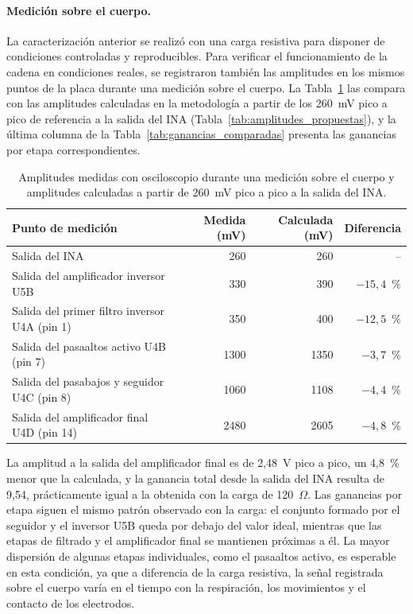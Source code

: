 \documentclass[12pt,a4paper]{article}
\begin{document}
\paragraph{Medición sobre el cuerpo.}
La caracterización anterior se realizó con una carga resistiva para disponer de condiciones
controladas y reproducibles. Para verificar el funcionamiento de la cadena en condiciones reales,
se registraron también las amplitudes en los mismos puntos de la placa durante una medición sobre
el cuerpo. La Tabla~\ref{tab:amplitudes_cuerpo} las compara con las amplitudes calculadas en la
metodología a partir de los 260~mV pico a pico de referencia a la salida del INA
(Tabla~\ref{tab:amplitudes_propuestas}), y la última columna de la
Tabla~\ref{tab:ganancias_comparadas} presenta las ganancias por etapa correspondientes.

\begin{table}[htbp]
    \centering
    \caption{Amplitudes medidas con osciloscopio durante una medición sobre el cuerpo y amplitudes
    calculadas a partir de 260~mV pico a pico a la salida del INA.}
    \label{tab:amplitudes_cuerpo}
    \begin{tabular}{lrrr}
        \hline
        Punto de medición & Medida (mV) & Calculada (mV) & Diferencia \\
        \hline
        Salida del INA & 260 & 260 & -- \\
        Salida del amplificador inversor U5B & 330 & 390 & $-15{,}4$~\% \\
        Salida del primer filtro inversor U4A (pin 1) & 350 & 400 & $-12{,}5$~\% \\
        Salida del pasaaltos activo U4B (pin 7) & 1300 & 1350 & $-3{,}7$~\% \\
        Salida del pasabajos y seguidor U4C (pin 8) & 1060 & 1108 & $-4{,}4$~\% \\
        Salida del amplificador final U4D (pin 14) & 2480 & 2605 & $-4{,}8$~\% \\
        \hline
    \end{tabular}
\end{table}

La amplitud a la salida del amplificador final es de 2,48~V pico a pico, un 4,8~\% menor que la
calculada, y la ganancia total desde la salida del INA resulta de 9,54, prácticamente igual a la
obtenida con la carga de 120~$\Omega$. Las ganancias por etapa siguen el mismo patrón observado
con la carga: el conjunto formado por el seguidor y el inversor U5B queda por debajo del valor
ideal, mientras que las etapas de filtrado y el amplificador final se mantienen próximas a él. La
mayor dispersión de algunas etapas individuales, como el pasaaltos activo, es esperable en esta
condición, ya que a diferencia de la carga resistiva, la señal registrada sobre el cuerpo varía en
el tiempo con la respiración, los movimientos y el contacto de los electrodos.
\end{document}
